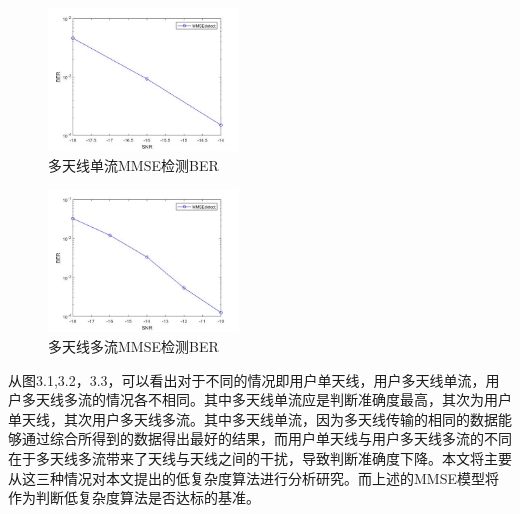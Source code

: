 \documentclass[bachelor,nocolorlinks, printoneside]{seuthesis} %
\begin{document}
\begin{Main}
\begin{figure}[htbp!]
	\centering \includegraphics[width=0.45\textwidth]{img/3_3.jpg} \caption{多天线单流MMSE检测BER}
\end{figure}

\begin{figure}[htbp!]
	\centering \includegraphics[width=0.45\textwidth]{img/3_8.jpg} \caption{多天线多流MMSE检测BER}
\end{figure}
从图3.1,3.2，3.3，可以看出对于不同的情况即用户单天线，用户多天线单流，用户多天线多流的情况各不相同。其中多天线单流应是判断准确度最高，其次为用户单天线，其次用户多天线多流。其中多天线单流，因为多天线传输的相同的数据能够通过综合所得到的数据得出最好的结果，而用户单天线与用户多天线多流的不同在于多天线多流带来了天线与天线之间的干扰，导致判断准确度下降。本文将主要从这三种情况对本文提出的低复杂度算法进行分析研究。而上述的MMSE模型将作为判断低复杂度算法是否达标的基准。


\end{Main}
\end{document}
